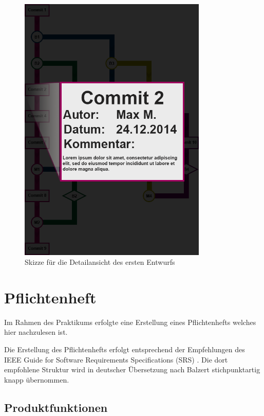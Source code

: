 \documentclass[color, ddc]{tudscrreprt}
\begin{document}
\begin{figure}[ht!]
\centering
\includegraphics[width=0.8\textwidth]{Skizzen/2015-01 VisualisierungsSkizze-rev_detail.png}
\caption{Skizze für die Detailansicht des ersten Entwurfs}
\label{entwurf_detail-img}
\end{figure}

\chapter{Pflichtenheft}

Im Rahmen des Praktikums erfolgte eine Erstellung eines Pflichtenhefts welches hier nachzulesen ist.

Die Erstellung des Pflichtenhefts erfolgt entsprechend der Empfehlungen des IEEE Guide for Software Requirements Specifications (SRS) \cite{ieee1998ieee}. Die dort empfohlene Struktur wird in deutscher Übersetzung nach Balzert \cite{balzert2009lehrbuch} stichpunktartig knapp übernommen.

\section{Produktfunktionen}
\end{document}
